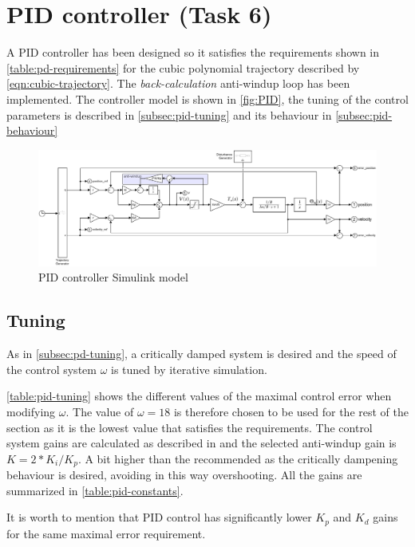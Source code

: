 \section{PID controller (Task 6)}
\label{sec:pd}

A PID controller has been designed so it satisfies the requirements shown in
\autoref{table:pd-requirements} for the cubic polynomial trajectory described
by \autoref{eqn:cubic-trajectory}. The \emph{back-calculation} anti-windup loop
has been implemented. The controller model is shown in \autoref{fig:PID}, the
tuning of the control parameters is described in \autoref{subsec:pid-tuning}
and its behaviour in \autoref{subsec:pid-behaviour}

\begin{figure}
    \includegraphics[width=\textwidth]{PID.slx.png}
    \caption{PID controller Simulink model}
    \label{fig:PID}
\end{figure}

\subsection{Tuning}
\label{subsec:pid-tuning}
As in \autoref{subsec:pd-tuning}, a critically damped system is desired and the
speed of the control system $\omega$ is tuned by iterative simulation.

\autoref{table:pid-tuning} shows the different values of the maximal control
error when modifying $\omega$. The value of $\omega = 18$ is therefore chosen to
be used for the rest of the section as it is the lowest value that satisfies
the requirements. The control system gains are calculated as described in
 \cite{SingleLink} and the selected anti-windup gain is
$K=2*K_i/K_p$. A bit higher than the recommended as the critically dampening
behaviour is desired, avoiding in this way overshooting. All the gains are
summarized in \autoref{table:pid-constants}.

It is worth to mention that PID control has significantly lower $K_p$ and
$K_d$ gains for the same maximal error requirement.


